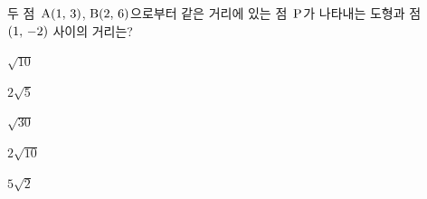 두 점~$\mathrm{A}(1,\mkern3mu 3)$, $\mathrm{B}(2,\mkern3mu 6)$으로부터 같은 거리에 있는 점~$\mathrm{P}$가 나타내는 도형과 점~$(1,\mkern3mu -2)$ 사이의 거리는?
\begin{choices32}{\rule[-3ex]{0pt}{8ex}$\sqrt{10}$}{\rule[-3ex]{0pt}{8ex}$2\sqrt{5}$}{\rule[-3ex]{0pt}{8ex}$\sqrt{30}$}{\rule[-3ex]{0pt}{8ex}$2\sqrt{10}$}{\rule[-3ex]{0pt}{8ex}$5\sqrt{2}$}\end{choices32}

